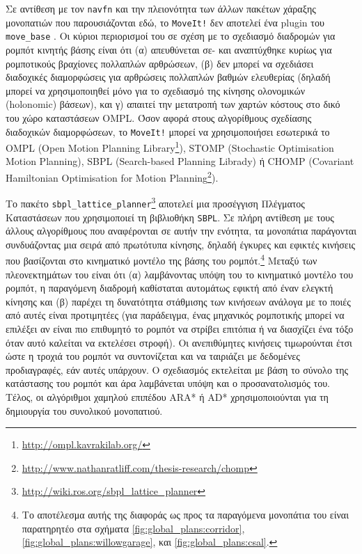 Σε αντίθεση με τον \texttt{navfn} και την πλειονότητα των άλλων πακέτων
χάραξης μονοπατιών που παρουσιάζονται εδώ, το \texttt{MoveIt!} δεν αποτελεί
ένα plugin του \texttt{move\_base} \cite{Chitta2012}. Οι κύριοι περιορισμοί του
σε σχέση με το σχεδιασμό διαδρομών για ρομπότ κινητής βάσης είναι ότι (α)
απευθύνεται σε- και αναπτύχθηκε κυρίως για ρομποτικούς βραχίονες πολλαπλών
αρθρώσεων, (β) δεν μπορεί να σχεδιάσει διαδοχικές διαμορφώσεις για αρθρώσεις
πολλαπλών βαθμών ελευθερίας (δηλαδή μπορεί να χρησιμοποιηθεί μόνο για το
σχεδιασμό της κίνησης ολονομικών (holonomic) βάσεων), και γ) απαιτεί
την μετατροπή των χαρτών κόστους στο δικό του χώρο καταστάσεων OMPL. Όσον
αφορά στους αλγορίθμους σχεδίασης διαδοχικών διαμορφώσεων, το \texttt{MoveIt!}
μπορεί να χρησιμοποιήσει εσωτερικά το OMPL (Open Motion Planning
Library\footnote{\url{http://ompl.kavrakilab.org/}}), STOMP (Stochastic
Optimisation Motion Planning), SBPL (Search-based Planning Librady) ή CHOMP
(Covariant Hamiltonian Optimisation for Motion
Planning\footnote{\url{http://www.nathanratliff.com/thesis-research/chomp}}).

Το πακέτο
\texttt{sbpl\_lattice\_planner}\footnote{\url{http://wiki.ros.org/sbpl\_lattice\_planner}}
αποτελεί μια προσέγγιση Πλέγματος Καταστάσεων \cite{MikhailPivtoraiko2005} που
χρησιμοποιεί τη βιβλιοθήκη \texttt{SBPL}. Σε πλήρη αντίθεση με τους
άλλους αλγορίθμους που αναφέρονται σε αυτήν την ενότητα, τα μονοπάτια
παράγονται συνδυάζοντας μια σειρά από πρωτότυπα κίνησης, δηλαδή έγκυρες και
εφικτές κινήσεις που βασίζονται στο κινηματικό μοντέλο της βάσης του
ρομπότ.\footnote{Το αποτέλεσμα αυτής της διαφοράς ως προς τα παραγόμενα
μονοπάτια του είναι παρατηρητέο στα σχήματα \ref{fig:global_plans:corridor},
\ref{fig:global_plans:willowgarage}, και \ref{fig:global_plans:csal}.} Μεταξύ
των πλεονεκτημάτων του είναι ότι (α) λαμβάνοντας υπόψη του το κινηματικό
μοντέλο του ρομπότ, η παραγόμενη διαδρομή καθίσταται αυτομάτως εφικτή από έναν
ελεγκτή κίνησης και (β) παρέχει τη δυνατότητα στάθμισης των κινήσεων ανάλογα με
το ποιές από αυτές είναι προτιμητέες (για παράδειγμα, ένας μηχανικός ρομποτικής
μπορεί να επιλέξει αν είναι πιο επιθυμητό το ρομπότ να στρίβει επιτόπια ή να
διασχίζει ένα τόξο όταν αυτό καλείται να εκτελέσει στροφή). Οι ανεπιθύμητες
κινήσεις τιμωρούνται έτσι ώστε η τροχιά του ρομπότ να συντονίζεται και να
ταιριάζει με δεδομένες προδιαγραφές, εάν αυτές υπάρχουν. Ο σχεδιασμός
εκτελείται με βάση το σύνολο της κατάστασης του ρομπότ και άρα λαμβάνεται υπόψη
και ο προσανατολισμός του.  Τέλος, οι αλγόριθμοι χαμηλού επιπέδου ARA*
\cite{Maxim2003} ή AD* \cite{Maxim2005} χρησιμοποιούνται για τη δημιουργία του
συνολικού μονοπατιού.

